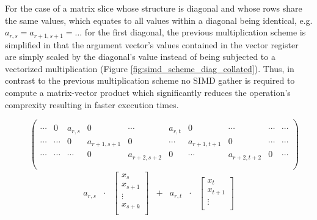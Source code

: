       For the case of a matrix slice whose structure is diagonal and whose rows share the same values, which equates to all values within a diagonal being identical, e.g. $a_{r,s} = a_{r+1, s+1} = \ldots$ for the first diagonal, the previous multiplication scheme is simplified in that the argument vector's values contained in the vector register are simply scaled by the diagonal's value instead of being subjected to a vectorized multiplication (Figure \ref{fig:simd_scheme_diag_collated}). Thus, in contrast to the previous multiplication scheme no SIMD gather is required to compute a matrix-vector product which significantly reduces the operation's comprexity resulting in faster execution times.

      \begin{figure}[ht]
        \centering
        $$
        \begin{pmatrix}
          \\
          \cdots & 0 & a_{r,s} &  0 & \cdots & a_{r,t} & 0 & \cdots & \cdots & \cdots \\
          \cdots & \cdots & 0 & a_{r+1,s+1} & 0 & \cdots & a_{r+1,t+1} & 0 & \cdots & \cdots \\
          \cdots & \cdots & \cdots & 0 & a_{r+2,s+2} & 0 & \cdots & a_{r+2,t+2} & 0 & \cdots \\
          \\
        \end{pmatrix}
        $$
        $$
        \begin{matrix}
          a_{r,s} & \cdot & \begin{bmatrix}
                                    x_s      \\
                                    x_{s+1}  \\
                                      \vdots \\
                                    x_{s+k}  \\
          \end{bmatrix} & + & a_{r,t} & \cdot & \begin{bmatrix}
                                                x_t \\
                                                x_{t+1} \\
                                                \vdots \\

\end{bmatrix}
\end{matrix}$$
\end{figure}
